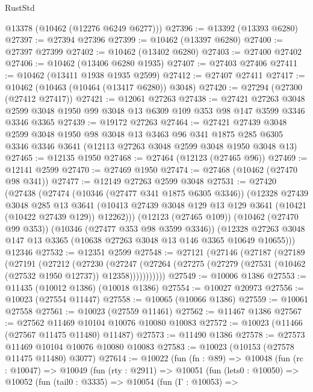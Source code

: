 \begin{lexlean}{RustStd}
\begin{coremodule}
      @13378
      (@10462 (@12276 @6249 @6277)))
@27396 := @13392 (@13393 @6280)
@27397 := @27394 @27396
@27399 := @10462 (@13397 @6280)
@27400 := @27397 @27399
@27402 := @10462 (@13402 @6280)
@27403 := @27400 @27402
@27406 := @10462 (@13406 @6280 @1935)
@27407 := @27403 @27406
@27411 := @10462 (@13411 @1938 @1935 @2599)
@27412 := @27407 @27411
@27417 := @10462 (@10463 (@10464 (@13417 @6280)) @3048)
@27420 := @27294 (@27300 (@27412 @27417))
@27421 := @12061 @27263
@27438 := @27421
    @27263
    @3048
    @2599
    @3048
    @1950
    @99
    @3048
    @13
    @6309
    @109
    @353
    @98
    @147
    @3599
    @3346
    @3346
    @3365
@27439 := @19172 @27263
@27464 := @27421
    @27439
    @3048
    @2599
    @3048
    @1950
    @98
    @3048
    @13
    @3463
    @96
    @341
    @1875
    @285
    @6305
    @3346
    @3346
    @3641
    (@12113 @27263 @3048 @2599 @3048 @1950 @3048 @13)
@27465 := @12135 @1950
@27468 := @27464 (@12123 (@27465 @96))
@27469 := @12141 @2599
@27470 := @27469 @1950
@27474 := @27468 (@10462 (@27470 @98 @341))
@27477 := @12149 @27263 @2599 @3048
@27531 := @27420
    (@27438
      (@27474
        (@10346 (@27477 @341 @1875 @6305 @3346))
        (@12328
          @27439
          @3048
          @285
          @13
          @3641
          (@10413 @27439 @3048 @129 @13 @129 @3641 (@10421 (@10422 @27439 @129)) @12262)))
      (@12123 (@27465 @109))
      (@10462 (@27470 @99 @353))
      (@10346 (@27477 @353 @98 @3599 @3346))
      (@12328 @27263 @3048 @147 @13 @3365 (@10638 @27263 @3048 @13 @146 @3365 @10649 @10655)))
    @12346
@27532 := @12351 @2599
@27548 := @27121
    (@27146
      (@27187
        (@27189
          (@27191
            (@27212
              (@27230
                (@27247
                  (@27264 (@27275 (@27279 (@27531 (@10462 (@27532 @1950 @12737)) @12358)))))))))))
@27549 := @10006 @1386
@27553 := @11435 (@10012 @1386) (@10018 @1386)
@27554 := @10027 @20973
@27556 := @10023 (@27554 @11447)
@27558 := @10065 (@10066 @1386)
@27559 := @10061 @27558
@27561 := @10023 (@27559 @11461)
@27562 := @11467 @1386
@27567 := @27562 @11469 @10104 @10076 @10080 @10083
@27572 := @10023 (@11466 (@27567 @11475 @11480) @11487)
@27573 := @11490 @1386
@27578 := @27573 @11469 @10104 @10076 @10080 @10083
@27583 := @10023 (@10153 (@27578 @11475 @11480) @3077)
@27614 := @10022
    (fun (fn : @89) =>
    @10048
      (fun (rc : @10047) =>
      @10049
        (fun (rty : @2911) =>
        @10051
          (fun (lets0 : @10050) =>
          @10052
            (fun (tail0 : @3335) =>
            @10054
              (fun (Γ : @10053) =>

\end{coremodule}
\end{lexlean}
